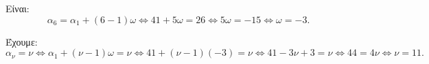 
\begin{alist}
\item Είναι:
\[\alpha_6 = \alpha_1 + (6 - 1)\omega \Leftrightarrow 41 + 5\omega = 26 \Leftrightarrow 5\omega = -15 \Leftrightarrow \omega = -3.\]

\item Έχουμε:
\[\alpha_\nu = \nu \Leftrightarrow \alpha_1 + (\nu - 1)\omega = \nu \Leftrightarrow 41 + (\nu - 1)(-3) = \nu \Leftrightarrow 41 - 3\nu + 3 = \nu \Leftrightarrow 44 = 4\nu \Leftrightarrow \nu = 11.\]
\end{alist}

